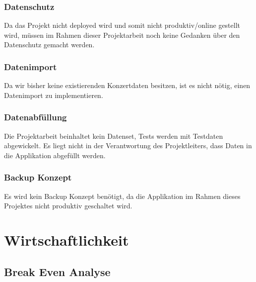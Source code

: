 \subsubsection{Datenschutz}\label{datenschutz}

Da das Projekt nicht deployed wird und somit nicht produktiv/online
gestellt wird, müssen im Rahmen dieser Projektarbeit noch keine Gedanken
über den Datenschutz gemacht werden.

\subsubsection{Datenimport}\label{datenimport}

Da wir bisher keine existierenden Konzertdaten besitzen, ist es nicht
nötig, einen Datenimport zu implementieren.

\subsubsection{Datenabfüllung}\label{datenabfuxfcllung}

Die Projektarbeit beinhaltet kein Datenset, Tests werden mit Testdaten
abgewickelt. Es liegt nicht in der Verantwortung des Projektleiters,
dass Daten in die Applikation abgefüllt werden.

\subsubsection{Backup Konzept}\label{backup-konzept}

Es wird kein Backup Konzept benötigt, da die Applikation im Rahmen
dieses Projektes nicht produktiv geschaltet wird.

\section{Wirtschaftlichkeit}\label{wirtschaftlichkeit}

\subsection{Break Even Analyse}\label{break-even-analyse}
